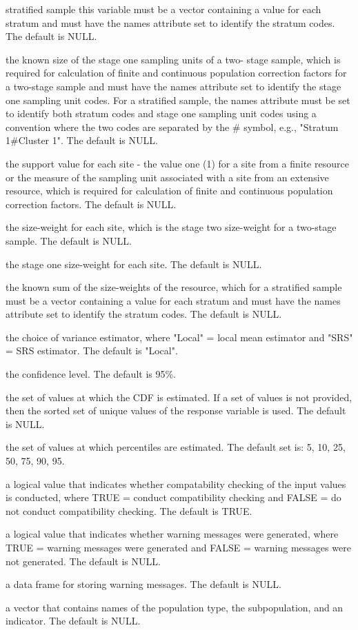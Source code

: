 \begin{Arguments}
\begin{ldescription}
stratified sample this variable must be a vector containing a value 
for each stratum and must have the names attribute set to identify the
stratum codes.  The default is NULL.
\item[\code{stage1size}] the known size of the stage one sampling units of a two-
stage sample, which is required for calculation of finite and  
continuous population correction factors for a two-stage sample and 
must have the names attribute set to identify the stage one sampling 
unit codes.  For a stratified sample, the names attribute must be set
to identify both stratum codes and stage one sampling unit codes using
a convention where the two codes are separated by the \# symbol, e.g.,
"Stratum 1\#Cluster 1".  The default is NULL.
\item[\code{support}] the support value for each site - the value one (1) for a 
site from a finite resource or the measure of the sampling unit  
associated with a site from an extensive resource, which is required  
for calculation of finite and continuous population correction  
factors.  The default is NULL.
\item[\code{swgt}] the size-weight for each site, which is the stage two size-weight 
for a two-stage sample.  The default is NULL.
\item[\code{swgt1}] the stage one size-weight for each site.  The default is NULL.
\item[\code{unitsize}] the known sum of the size-weights of the resource, which for a 
stratified sample must be a vector containing a value for each stratum 
and must have the names attribute set to identify the stratum codes.  
The default is NULL.
\item[\code{vartype}] the choice of variance estimator, where "Local" = local mean
estimator and "SRS" = SRS estimator.  The default is "Local".
\item[\code{conf}] the confidence level.  The default is 95\%.
\item[\code{cdfval}] the set of values at which the CDF is estimated.  If a set of
values is not provided, then the sorted set of unique values of the
response variable is used.  The default is NULL.
\item[\code{pctval}] the set of values at which percentiles are estimated.  The
default set is: {5, 10, 25, 50, 75, 90, 95}.
\item[\code{check.ind}] a logical value that indicates whether compatability
checking of the input values is conducted, where TRUE = conduct 
compatibility checking and FALSE = do not conduct compatibility 
checking.  The default is TRUE.
\item[\code{warn.ind}] a logical value that indicates whether warning messages were
generated, where TRUE = warning messages were generated and FALSE = warning
messages were not generated.  The default is NULL.
\item[\code{warn.df}] a data frame for storing warning messages.  The default is
NULL.
\item[\code{warn.vec}] a vector that contains names of the population type, the
subpopulation, and an indicator.  The default is NULL.
\end{ldescription}
\end{Arguments}
